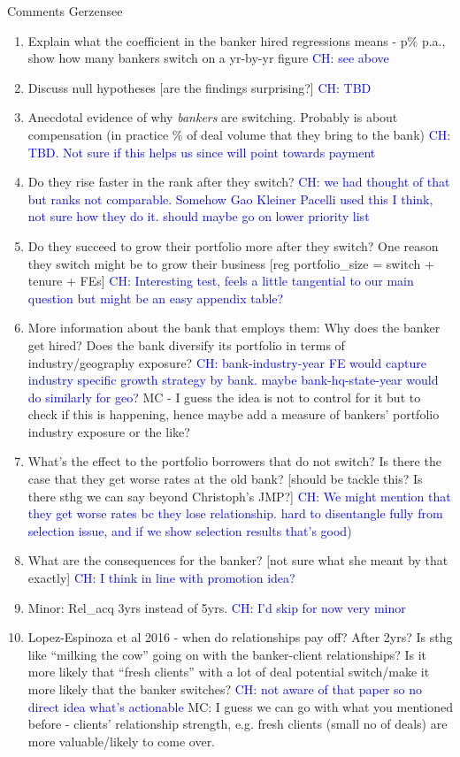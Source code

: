 Comments Gerzensee
\begin{enumerate}
	\item Explain what the coefficient in the banker hired regressions means - p\% p.a., show how many bankers switch on a yr-by-yr figure \textcolor{blue}{CH: see above}
	\item Discuss null hypotheses [are the findings surprising?] \textcolor{blue}{CH: TBD}
	\item Anecdotal evidence of why \emph{bankers} are switching. Probably is about compensation (in practice \% of deal volume that they bring to the bank) \textcolor{blue}{CH: TBD. Not sure if this helps us since will point towards payment}
	\item Do they rise faster in the rank after they switch? \textcolor{blue}{CH: we had thought of that but ranks not comparable. Somehow Gao Kleiner Pacelli used this I think, not sure how they do it. should maybe go on lower priority list}
	\item Do they succeed to grow their portfolio more after they switch? One reason they switch might be to grow their business [reg portfolio\_size = switch + tenure + FEs] \textcolor{blue}{CH: Interesting test, feels a little tangential to our main question but might be an easy appendix table?}
	\item More information about the bank that employs them: Why does the banker get hired? Does the bank diversify its portfolio in terms of industry/geography exposure? \textcolor{blue}{CH: bank-industry-year FE would capture industry specific growth strategy by bank. maybe bank-hq-state-year would do similarly for geo?} MC - I guess the idea is not to control for it but to check if this is happening, hence maybe add a measure of bankers' portfolio industry exposure or the like?
	\item What's the effect to the portfolio borrowers that do not switch? Is there the case that they get worse rates at the old bank? [should be tackle this? Is there sthg we can say beyond Christoph's JMP?]  \textcolor{blue}{CH: We might mention that they get worse rates bc they lose relationship. hard to disentangle fully from selection issue, and if we show selection results that's good)}
	\item What are the consequences for the banker? [not sure what she meant by that exactly] \textcolor{blue}{CH: I think in line with promotion idea?}
	\item Minor: Rel\_acq 3yrs instead of 5yrs. \textcolor{blue}{CH: I'd skip for now very minor}
	\item Lopez-Espinoza et al 2016 - when do relationships pay off? After 2yrs? Is sthg like ``milking the cow'' going on with the banker-client relationships? Is it more likely that ``fresh clients'' with a lot of deal potential switch/make it more likely that the banker switches? \textcolor{blue}{CH: not aware of that paper so no direct idea what's actionable } MC: I guess we can go with what you mentioned before - clients' relationship strength, e.g. fresh clients (small no of deals) are more valuable/likely to come over. 

\end{enumerate}
